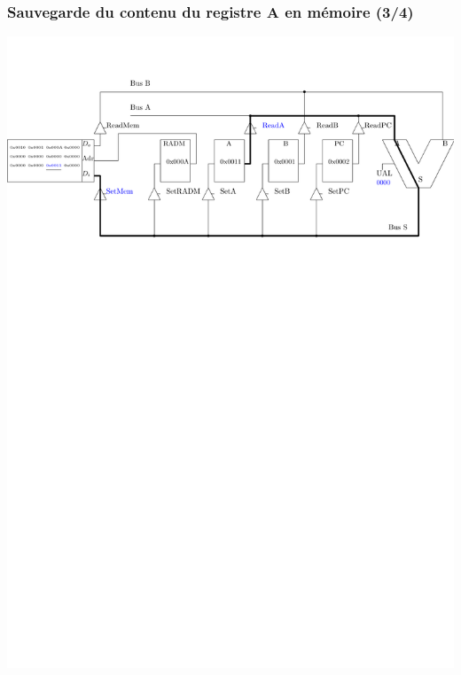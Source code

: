 \documentclass{beamer}
\begin{document}
\begin{frame}
\frametitle{Sauvegarde du contenu du registre A en mémoire (3/4)}
\includegraphics[width=\linewidth]{Figs/premier_chemin_sta3.pdf}
\end{frame}
\end{document}

